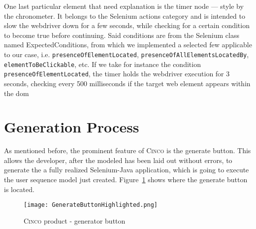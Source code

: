 One last particular element that need explanation is the timer node --- style by the chronometer. It belongs to the Selenium actions category and is intended to slow the webdriver down for a few seconds, while checking for a certain condition to become true before continuing. Said conditions are from the Selenium class named ExpectedConditions, from which we implemented a selected few applicable to our case, i.e. \lstinline{presenceOfElementLocated}, \lstinline{presenceOfAllElementsLocatedBy}, \lstinline{elementToBeClickable}, etc. If we take for instance the condition \lstinline{presenceOfElementLocated}, the timer holds the webdriver execution for 3 seconds, checking every 500 milliseconds if the target web element appears within the \acrshort{dom}

\section{Generation Process}\label{sec:GenProcess}

As mentioned before, the prominent feature of \textsc{Cinco} is the generate button. This allows the developer, after the modeled has been laid out without errors, to generate the a fully realized Selenium-Java application, which is going to execute the user sequence model just created. Figure~\ref{fig:genButton} shows where the generate button is located.

\begin{figure}[H]
    \centering
    \texttt{[image: GenerateButtonHighlighted.png]}
    \caption{\textsc{Cinco} product - generator button}
    \label{fig:genButton}
\end{figure}
